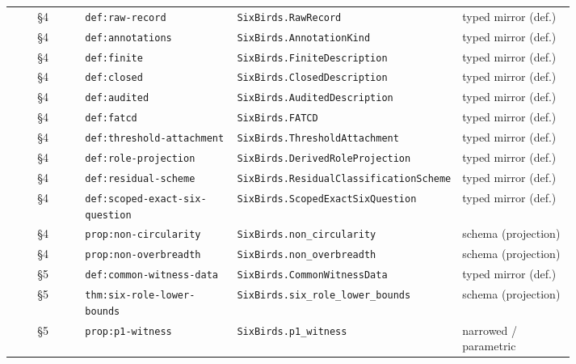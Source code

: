 \documentclass[11pt]{article}
\theoremstyle{definition}
\begin{document}
{\begin{longtable}{@{}c >{\raggedright\arraybackslash}p{0.27\linewidth} >{\raggedright\arraybackslash}p{0.34\linewidth} >{\raggedright\arraybackslash}p{0.20\linewidth}@{}}
§4 & \texttt{def:\allowbreak raw-\allowbreak record} & \texttt{SixBirds.\allowbreak RawRecord} & typed mirror (def.) \\
§4 & \texttt{def:\allowbreak annotations} & \texttt{SixBirds.\allowbreak AnnotationKind} & typed mirror (def.) \\
§4 & \texttt{def:\allowbreak finite} & \texttt{SixBirds.\allowbreak FiniteDescription} & typed mirror (def.) \\
§4 & \texttt{def:\allowbreak closed} & \texttt{SixBirds.\allowbreak ClosedDescription} & typed mirror (def.) \\
§4 & \texttt{def:\allowbreak audited} & \texttt{SixBirds.\allowbreak AuditedDescription} & typed mirror (def.) \\
§4 & \texttt{def:\allowbreak fatcd} & \texttt{SixBirds.\allowbreak FATCD} & typed mirror (def.) \\
§4 & \texttt{def:\allowbreak threshold-\allowbreak attachment} & \texttt{SixBirds.\allowbreak ThresholdAttachment} & typed mirror (def.) \\
§4 & \texttt{def:\allowbreak role-\allowbreak projection} & \texttt{SixBirds.\allowbreak DerivedRoleProjection} & typed mirror (def.) \\
§4 & \texttt{def:\allowbreak residual-\allowbreak scheme} & \texttt{SixBirds.\allowbreak ResidualClassificationScheme} & typed mirror (def.) \\
§4 & \texttt{def:\allowbreak scoped-\allowbreak exact-\allowbreak six-\allowbreak question} & \texttt{SixBirds.\allowbreak ScopedExactSixQuestion} & typed mirror (def.) \\
§4 & \texttt{prop:\allowbreak non-\allowbreak circularity} & \texttt{SixBirds.\allowbreak non\_\allowbreak circularity} & schema (projection) \\
§4 & \texttt{prop:\allowbreak non-\allowbreak overbreadth} & \texttt{SixBirds.\allowbreak non\_\allowbreak overbreadth} & schema (projection) \\
§5 & \texttt{def:\allowbreak common-\allowbreak witness-\allowbreak data} & \texttt{SixBirds.\allowbreak CommonWitnessData} & typed mirror (def.) \\
§5 & \texttt{thm:\allowbreak six-\allowbreak role-\allowbreak lower-\allowbreak bounds} & \texttt{SixBirds.\allowbreak six\_\allowbreak role\_\allowbreak lower\_\allowbreak bounds} & schema (projection) \\
§5 & \texttt{prop:\allowbreak p1-\allowbreak witness} & \texttt{SixBirds.\allowbreak p1\_\allowbreak witness} & narrowed / parametric \\

\end{longtable}}
\end{document}
